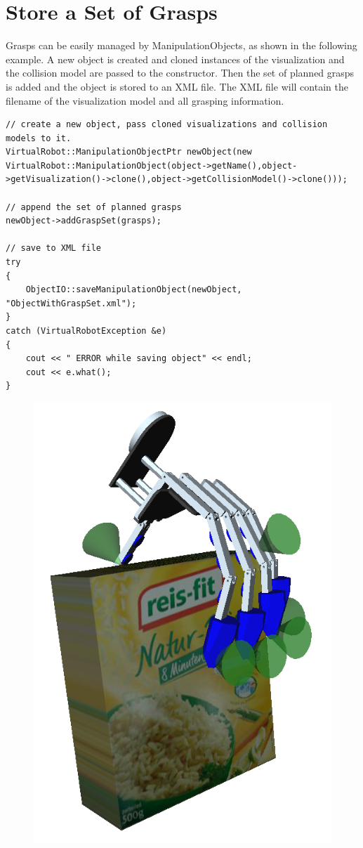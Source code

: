 \documentclass{book}
\begin{document}
\section{Store a Set of Grasps}
Grasps can be easily managed by ManipulationObjects, as shown in the following example. A new object is created and cloned instances of the visualization and the collision model are passed to the constructor. Then the set of planned grasps is added and the object is stored to an XML file. The XML file will contain the filename of the visualization model and all grasping information.
\begin{lstlisting}
// create a new object, pass cloned visualizations and collision models to it.
VirtualRobot::ManipulationObjectPtr newObject(new VirtualRobot::ManipulationObject(object->getName(),object->getVisualization()->clone(),object->getCollisionModel()->clone()));

// append the set of planned grasps
newObject->addGraspSet(grasps);

// save to XML file
try
{
    ObjectIO::saveManipulationObject(newObject, "ObjectWithGraspSet.xml");
}
catch (VirtualRobotException &e)
{
    cout << " ERROR while saving object" << endl;
    cout << e.what();
}
\end{lstlisting}
\begin{figure}[H]
	\centering
	\includegraphics[scale = 0.3]{Grasp1}
\end{figure}
\end{document}
